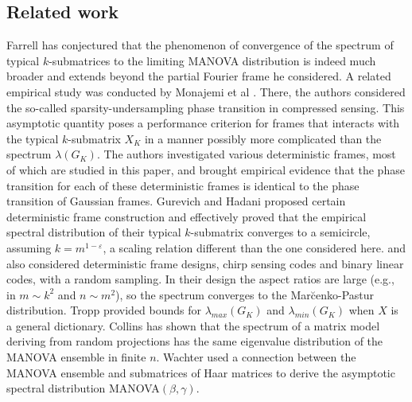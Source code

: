 \documentclass[a4paper,12pt]{article}
\newcommand{\m}{m}
\newcommand{\Xk}{\ensuremath{X_K}}
\newcommand{\Gk}{\ensuremath{G_K}}
\begin{document}
\subsection*{Related work} \label{sec:related}


Farrell \cite{Farrell} has
conjectured that the phenomenon of convergence of the spectrum of typical
$k$-submatrices to the limiting MANOVA distribution is indeed much broader and
extends beyond the partial Fourier frame he considered.
%
A related empirical study was conducted by Monajemi et al \cite{Monajemi}.
There, the
authors considered the so-called sparsity-undersampling phase transition in
compressed sensing. This asymptotic quantity poses a performance criterion for
frames that interacts with the typical $k$-submatrix $\Xk$ in a manner possibly
more complicated than the spectrum $\lambda(\Gk)$. The authors investigated
various deterministic frames, most of which are studied in this paper, and
brought empirical evidence that the phase transition for each of these
deterministic frames is identical to the phase transition of Gaussian frames.
%
Gurevich and Hadani \cite{Gurevich2009} proposed certain deterministic frame
construction and effectively proved that the empirical spectral distribution of
their typical $k$-submatrix converges to a semicircle, assuming
$k=\m^{1-\varepsilon}$, a scaling relation different than the one considered
here.
\cite{R21} and \cite{R22} also considered deterministic frame designs,
chirp sensing codes and binary linear codes, with a random sampling.
In their design the aspect ratios are large (e.g., in \cite{R21}
$m \sim k^2$ and $n \sim m^2$), so the spectrum converges to the
Mar\u cenko-Pastur distribution.
%
%
Tropp \cite{Tropp_cond} provided bounds for $\lambda_{max}(\Gk)$ and
$\lambda_{min}(\Gk)$ when $X$ is a general dictionary.
%
%
Collins \cite{Collins} has shown that the spectrum 
of a matrix model deriving
from random projections has the same eigenvalue distribution of the MANOVA
ensemble in finite
$n$. Wachter \cite{wachter} used a connection between the MANOVA ensemble and
submatrices of Haar matrices to derive the asymptotic spectral distribution
MANOVA$(\beta,\gamma)$.
\end{document}
